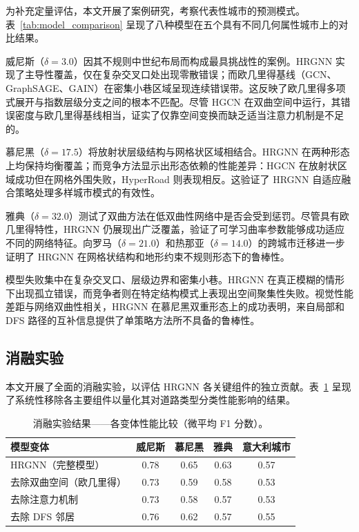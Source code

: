 为补充定量评估，本文开展了案例研究，考察代表性城市的预测模式。表~\ref{tab:model_comparison} 呈现了八种模型在五个具有不同几何属性城市上的对比结果。

威尼斯（$\delta=3.0$）因其不规则中世纪布局而构成最具挑战性的案例。HRGNN 实现了主导性覆盖，仅在复杂交叉口处出现零散错误；而欧几里得基线（GCN、GraphSAGE、GAIN）在密集小巷区域呈现连续错误带。这反映了欧几里得多项式展开与指数层级分支之间的根本不匹配。尽管 HGCN 在双曲空间中运行，其错误密度与欧几里得基线相当，证实了仅靠空间变换而缺乏适当注意力机制是不足的。

慕尼黑（$\delta=17.5$）将放射状层级结构与网格状区域相结合。HRGNN 在两种形态上均保持均衡覆盖；而竞争方法显示出形态依赖的性能差异：HGCN 在放射状区域成功但在网格外围失败，HyperRoad 则表现相反。这验证了 HRGNN 自适应融合策略处理多样城市模式的有效性。

雅典（$\delta=32.0$）测试了双曲方法在低双曲性网络中是否会受到惩罚。尽管具有欧几里得特性，HRGNN 仍展现出广泛覆盖，验证了可学习曲率参数能够成功适应不同的网络特征。向罗马（$\delta=21.0$）和热那亚（$\delta=14.0$）的跨城市迁移进一步证明了 HRGNN 在网格状结构和地形约束不规则形态下的鲁棒性。

模型失败集中在复杂交叉口、层级边界和密集小巷。HRGNN 在真正模糊的情形下出现孤立错误，而竞争者则在特定结构模式上表现出空间聚集性失败。视觉性能差距与网络双曲性相关，HRGNN 在慕尼黑双重形态上的成功表明，来自局部和 DFS 路径的互补信息提供了单策略方法所不具备的鲁棒性。

\subsection{消融实验}

本文开展了全面的消融实验，以评估 HRGNN 各关键组件的独立贡献。表~\ref{tab:ablation} 呈现了系统性移除各主要组件以量化其对道路类型分类性能影响的结果。

\begin{table}[t]
\centering
\caption{消融实验结果——各变体性能比较（微平均 F1 分数）。}
\label{tab:ablation}
\footnotesize
\begin{tabular}{@{}lcccc@{}}
\toprule
\textbf{模型变体} & \textbf{威尼斯} & \textbf{慕尼黑} & \textbf{雅典} & \textbf{意大利城市} \\
\midrule
HRGNN（完整模型）& 0.78 & 0.65 & 0.63 & 0.57 \\
\midrule
去除双曲空间（欧几里得）& 0.73 & 0.59 & 0.58 & 0.53 \\
去除注意力机制 & 0.73 & 0.58 & 0.57 & 0.53 \\
去除 DFS 邻居 & 0.76 & 0.62 & 0.57 & 0.55 \\
\bottomrule
\end{tabular}
\end{table}


